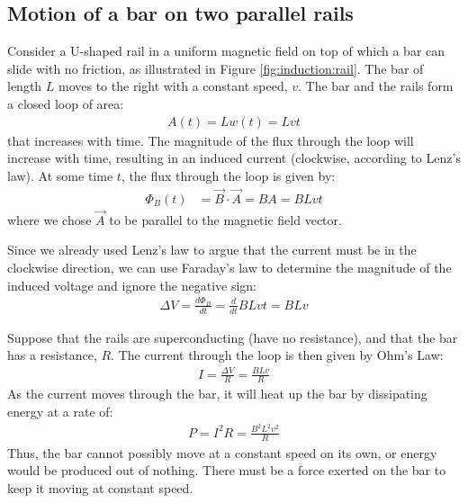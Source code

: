 \subsection{Motion of a bar on two parallel rails}
Consider a U-shaped rail in a uniform magnetic field on top of which a bar can slide with no friction, as illustrated in Figure \ref{fig:induction:rail}. The bar of length $L$ moves to the right with a constant speed, $v$. 
The bar and the rails form a closed loop of area:
\begin{align*}
A(t)=Lw(t)=Lvt
\end{align*} 
that increases with time. The magnitude of the flux through the loop will increase with time, resulting in an induced current (clockwise, according to Lenz's law). At some time $t$, the flux through the loop is given by:
\begin{align*}
\Phi_B (t) &=  \vec B \cdot \vec A =BA=BLvt
\end{align*}
where we chose $\vec A$ to be parallel to the magnetic field vector. 

Since we already used Lenz's law to argue that the current must be in the clockwise direction, we can use Faraday's law to determine the magnitude of the induced voltage and ignore the negative sign:
\begin{align*}
\Delta V = \frac{d \Phi_B}{dt}=\frac{d}{dt}BLvt = BLv
\end{align*}

Suppose that the rails are superconducting (have no resistance), and that the bar has a resistance, $R$. The current through the loop is then given by Ohm's Law:
\begin{align*}
I=\frac{\Delta V}{R}=\frac{BLv}{R}
\end{align*}
As the current moves through the bar, it will heat up the bar by dissipating energy at a rate of:
\begin{align*}
P=I^2 R = \frac{B^2L^2v^2}{R}
\end{align*}
Thus, the bar cannot possibly move at a constant speed on its own, or energy would be produced out of nothing. There must be a force exerted on the bar to keep it moving at constant speed. 


